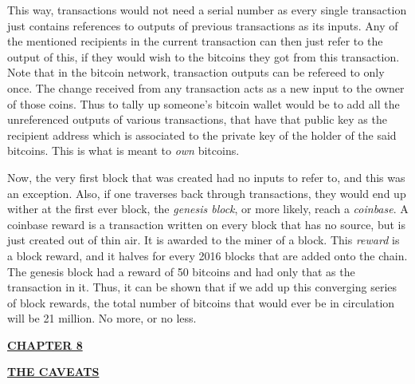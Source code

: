 \documentclass[12pt,a4paper]{report}
\begin{document}
\begin{justify}
This way, transactions would not need a serial number as every single transaction just contains references to outputs of previous transactions as its inputs. Any of the mentioned recipients in the current transaction can then just refer to the output of this, if they would wish to  the bitcoins they got from this transaction.\newline
Note that in the bitcoin network, transaction outputs can be refereed to only once. The change received from any transaction acts as a new input to the owner of those coins. Thus to tally up someone's bitcoin wallet would be to add all the unreferenced outputs of various transactions, that have that public key as the recipient address which is associated to the private key of the holder of the said bitcoins. This is what is meant to \textit{own} bitcoins. 
\vspace{10mm}

Now, the very first block that was created had no inputs to refer to, and this was an exception. Also, if one traverses back through transactions, they would end up wither at the first ever block, the \textit{genesis block}, or more likely, reach a \textit{coinbase}. A coinbase reward is a transaction written on every block that has no source, but is just created out of thin air. It is awarded to the miner of a block. This \textit{reward} is a block reward, and it halves for every 2016 blocks that are added onto the chain. The genesis block had a reward of 50 bitcoins and had only that as the transaction in it. Thus, it can be shown that if we add up this converging series of block rewards, the total number of bitcoins that would ever be in circulation will be 21 million. No more, or no less.

\newpage

\begin{center}\underline{ \Large \textbf{CHAPTER 8}}\end{center}
\begin{center}\underline{ \Large \textbf{THE CAVEATS}}\end{center}
\vspace{10mm}


\end{justify}
\end{document}
